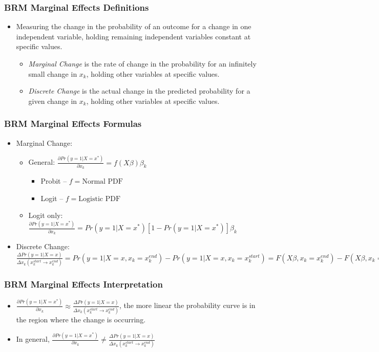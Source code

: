 \documentclass{beamer}
\begin{document}
\begin{frame}
	\frametitle{BRM Marginal Effects Definitions}
		\begin{itemize}
			\item Measuring the change in the probability of an outcome for a change in one independent variable, holding remaining independent variables constant at specific values.
				\begin{itemize}
					\item \textit{Marginal Change} is the rate of change in the probability for an infinitely small change in $x_{k}$, holding other variables at specific values.
					\item \textit{Discrete Change} is the actual change in the predicted probability for a given change in $x_{k}$, holding other variables at specific values.
				\end{itemize}
		\end{itemize}
\end{frame}

\begin{frame}
	\frametitle{BRM Marginal Effects Formulas}
		\begin{itemize}
			\item Marginal Change: 
				\begin{itemize}
					\item General: $\frac{\partial Pr\left(y=1|X=x^{*}\right)}{\partial x_{k}}=f(X\beta)\beta_{k}$
						\begin{itemize}
							\item Probit -- $f=\mbox{Normal PDF}$
							\item Logit -- $f=\mbox{Logistic PDF}$
						\end{itemize}
					\item Logit only: $\frac{\partial Pr\left(y=1|X=x^{*}\right)}{\partial x_{k}}=Pr\left(y=1|X=x^{*}\right)\left[1-Pr\left(y=1|X=x^{*}\right)\right]\beta_{k}$
				\end{itemize}
			\item Discrete Change: $\frac{\Delta Pr\left(y=1|X=x\right)}{\Delta x_{k}\left(x^{start}_{k}\rightarrow x^{end}_{k}\right)}=Pr\left(y=1|X=x, x_{k}=x^{end}_{k}\right)-Pr\left(y=1|X=x, x_{k}=x^{start}_{k}\right)=F(X\beta, x_{k}=x^{end}_{k})-F(X\beta, x_{k}=x^{start}_{k})$
		\end{itemize}
\end{frame}

\begin{frame}
	\frametitle{BRM Marginal Effects Interpretation}
		\begin{itemize}
			\item $\frac{\partial Pr\left(y=1|X=x^{*}\right)}{\partial x_{k}}\approx\frac{\Delta Pr\left(y=1|X=x\right)}{\Delta x_{k}\left(x^{start}_{k}\rightarrow x^{end}_{k}\right)}$, the more linear the probability curve is in the region where the change is occurring.
			\item In general, $\frac{\partial Pr\left(y=1|X=x^{*}\right)}{\partial x_{k}}\neq\frac{\Delta Pr\left(y=1|X=x\right)}{\Delta x_{k}\left(x^{start}_{k}\rightarrow x^{end}_{k}\right)}$
		\end{itemize}
\end{frame}
\end{document}
